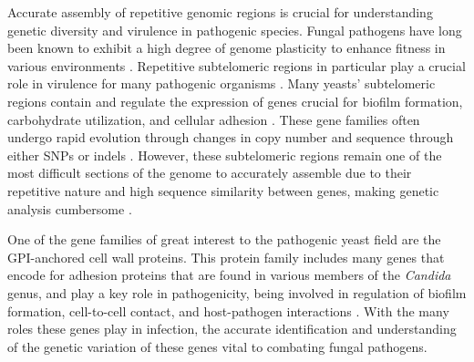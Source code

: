 Accurate assembly of repetitive genomic regions is crucial for understanding genetic diversity and virulence in pathogenic species. Fungal pathogens have long been known to exhibit a high degree of genome plasticity to enhance fitness in various environments \citep{Croll2013-mm, Ford2015-qs, Lopez-Fuentes2018-zt, Carrete2019-xo, Todd2019-sy}. Repetitive subtelomeric regions in particular play a crucial role in virulence for many pathogenic organisms \citep{Barry2003-ln, De_Las_Penas2003-zd}. Many yeasts’ subtelomeric regions contain and regulate the expression of genes crucial for biofilm formation, carbohydrate utilization, and cellular adhesion \citep{Naumov1995-ju,  De_Las_Penas2003-zd, Iraqui2005-hy}. These gene families often undergo rapid evolution through changes in copy number and sequence through either SNPs or indels \citep{Carreto2008-pz, Brown2010-az, Anderson2015-fa}. However, these subtelomeric regions remain one of the most difficult sections of the genome to accurately assemble due to their repetitive nature and high sequence similarity between genes, making genetic analysis cumbersome \citep{Brown2010-az}.

One of the gene families of great interest to the pathogenic yeast field are the GPI-anchored cell wall proteins. This protein family includes many genes that encode for adhesion proteins that are found in various members of the \textit{Candida} genus, and play a key role in pathogenicity, being involved in regulation of biofilm formation, cell-to-cell contact, and host-pathogen interactions \citep{Timmermans2018-ci, McCall2019-zn}. With the many roles these genes play in infection, the accurate identification and understanding of the genetic variation of these genes vital to combating fungal pathogens.

